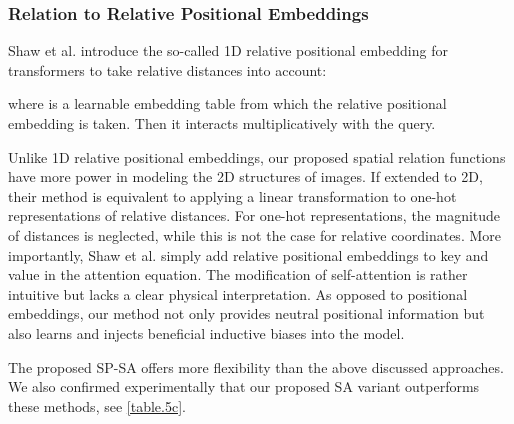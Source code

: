 \documentclass[authorversion, sigconf, acmthm=false, nonacm=true]{acmart}
\begin{document}
\subsubsection{Relation to Relative Positional Embeddings}
Shaw et al. \cite{shaw2018self} introduce the so-called 1D relative positional embedding for transformers to take relative distances into account:


\noindent where  is a learnable embedding table from which the relative positional embedding is taken. Then it interacts multiplicatively with the query.

Unlike 1D relative positional embeddings, our proposed spatial relation functions have more power in modeling the 2D structures of images. 
If extended to 2D, their method is equivalent to applying a linear transformation to one-hot representations of relative distances. 
For one-hot representations, the magnitude of distances is neglected, while this is not the case for relative coordinates.  
More importantly, Shaw et al. \cite{shaw2018self} simply add relative positional embeddings to key and value in the attention equation. The modification of self-attention 
is rather intuitive but lacks a clear physical interpretation. As opposed to positional embeddings,
our method not only provides neutral positional information but also learns and injects beneficial inductive biases into the model. 
 


The proposed SP-SA offers more flexibility than the above discussed approaches. We also confirmed experimentally that our proposed SA variant outperforms these methods, see \cref{table.5c}.
\end{document}
